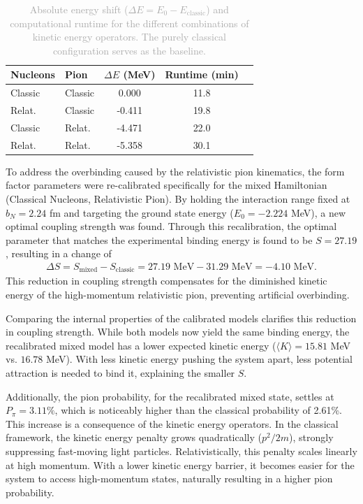 \documentclass[a4paper,oneside,article,12pt]{memoir}
\begin{document}
\begin{table}[H]
    \centering
    \renewcommand{\arraystretch}{1.2}
    \begin{tabular}{ll ccc}
        \hline
        \textbf{Nucleons} & \textbf{Pion} & \textbf{$\Delta E$ (MeV)} & \textbf{Runtime (min)} \\
        \hline
        Classic & Classic &    0.000 & 11.8 \\
        Relat.  & Classic &   -0.411 & 19.8 \\
        Classic & Relat.  &   -4.471 & 22.0 \\
        Relat.  & Relat.  &   -5.358 & 30.1 \\
        \hline
    \end{tabular}
    \caption{\textcolor{darkgray}{Absolute energy shift ($\Delta E = E_0 - E_{\text{classic}}$) and computational runtime for the different combinations of kinetic energy operators. The purely classical configuration serves as the baseline.}}
    \label{tab:runtime_deviation}
\end{table}

To address the overbinding caused by the relativistic pion kinematics, the form factor parameters were re-calibrated specifically for the mixed Hamiltonian (Classical Nucleons, Relativistic Pion). By holding the interaction range fixed at $b_N = 2.24$ fm and targeting the ground state energy ($E_0 = -2.224$ MeV), a new optimal coupling strength was found. Through this recalibration, the optimal parameter that matches the experimental binding energy is found to be $S=27.19$, resulting in a change of
\begin{align}
    \Delta S = S_{\text{mixed}} - S_{\text{classic}} = 27.19 \text{ MeV} - 31.29 \text{ MeV} = -4.10 \text{ MeV}.
\end{align}
This reduction in coupling strength compensates for the diminished kinetic energy of the high-momentum relativistic pion, preventing artificial overbinding.

Comparing the internal properties of the calibrated models clarifies this reduction in coupling strength. While both models now yield the same binding energy, the recalibrated mixed model has a lower expected kinetic energy ($\langle K \rangle = 15.81$ MeV vs. $16.78$ MeV). With less kinetic energy pushing the system apart, less potential attraction is needed to bind it, explaining the smaller $S$. 

Additionally, the pion probability, for the recalibrated mixed state, settles at $P_\pi = 3.11\%$, which is noticeably higher than the classical probability of 2.61\%. This increase is a consequence of the kinetic energy operators. In the classical framework, the kinetic energy penalty grows quadratically ($p^2/2m$), strongly suppressing fast-moving light particles. Relativistically, this penalty scales linearly at high momentum. With a lower kinetic energy barrier, it becomes easier for the system to access high-momentum states, naturally resulting in a higher pion probability.
\end{document}
